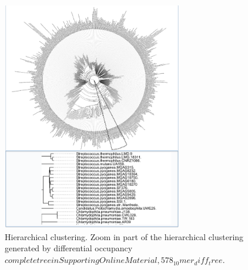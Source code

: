 \documentclass[12pt]{article}
\begin{document}
\begin{figure}
%
\begin{center}
%
\includegraphics[width=0.7\textwidth]{Hierarchical_clustering.pdf}
%
\caption{\label{fig:clustering}Hierarchical clustering. Zoom in part of the hierarchical clustering generated by differential occupancy \(complete tree in Supporting Online Material, 578_10mer_diff_tree\).}
%
\end{center}
\end{figure}
\end{document}
